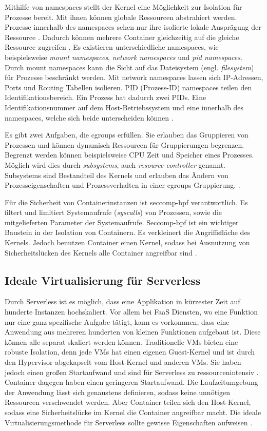 Mithilfe von namespaces stellt der Kernel eine Möglichkeit zur Isolation
für Prozesse bereit. Mit ihnen können globale Ressourcen abstrahiert werden.
Prozesse innerhalb des namespaces sehen nur ihre isolierte lokale
Ausprägung der Ressource \cite{UbuntuNamespaces}.
Dadurch können mehrere Container gleichzeitig auf die gleiche
Ressource zugreifen \cite{RedHatIntroToLinuxContainers}.
Es existieren unterschiedliche namespaces, wie beispielsweise
\emph{mount namespaces}, \emph{network namespaces}
und \emph{pid namespaces}.
Durch mount namespaces kann die Sicht auf das Dateisystem
(engl. \emph{filesystem}) für Prozesse beschränkt werden.
Mit network namespaces lassen sich IP-Adressen, Ports
und Routing Tabellen isolieren. PID (Prozess-ID) namespaces teilen
den Identifikationsbereich. Ein Prozess hat dadurch zwei
PIDs. Eine Identifikationsnummer auf dem Host-Betriebssystem und eine
innerhalb des namespaces, welche sich beide unterscheiden können
\cite{LwnDotNetNamespaces}.

Es gibt zwei Aufgaben, die cgroups erfüllen. Sie erlauben das Gruppieren
von Prozessen und können dynamisch Ressourcen für Gruppierungen begrenzen.
Begrenzt werden können beispielsweise CPU Zeit und Speicher eines Prozesses.
Möglich wird dies durch \emph{subsystems},
auch \emph{resource controller} genannt. Subsystems sind Bestandteil
des Kernels und erlauben das Ändern von Prozesseigenschaften und
Prozessverhalten in einer cgroups Gruppierung. 
\cite{RedHatIntroToLinuxContainers}.

Für die Sicherheit von Containerinstanzen ist seccomp-bpf 
verantwortlich. Es filtert und limitiert
Systemaufrufe (\emph{syscalls}) von Prozessen,
sowie die mitgelieferten Parameter der Systemaufrufe.
Seccomp-bpf ist ein wichtiger Baustein in der Isolation von
Containern. Es verkleinert die Angriffsfläche 
des Kernels. Jedoch benutzen Container einen
Kernel, sodass bei Ausnutzung von Sicherheitslücken
des Kernels alle Container angreifbar sind \cite{Firecracker}.

\subsection{Ideale Virtualisierung für Serverless}
Durch Serverless ist es möglich,
dass eine Applikation in kürzester Zeit
auf hunderte Instanzen hochskaliert. Vor allem bei FaaS Diensten,
wo eine Funktion nur eine ganz spezifische Aufgabe tätigt,
kann es vorkommen, dass eine Anwendung aus mehreren hunderten
von kleinen Funktionen aufgebaut ist. Diese können alle separat
skaliert werden können. Traditionelle VMs bieten
eine robuste Isolation, denn jede VMs hat einen eigenen
Guest-Kernel und ist durch den Hypervisor
abgekapselt vom Host-Kernel und anderen VMs. Sie haben jedoch
einen großen Startaufwand und sind für Serverless zu
ressourcenintensiv \cite{Firecracker}. Container dagegen
haben einen geringeren Startaufwand. Die Laufzeitumgebung der
Anwendung lässt sich genaustens definieren, sodass keine
unnötigen Ressourcen verschwendet werden. Aber Container
teilen sich den Host-Kernel, sodass eine Sicherheitslücke
im Kernel die Container angreifbar macht.
Die ideale Virtualisierungsmethode für Serverless sollte
gewisse Eigenschaften aufweisen \cite{Firecracker}.

